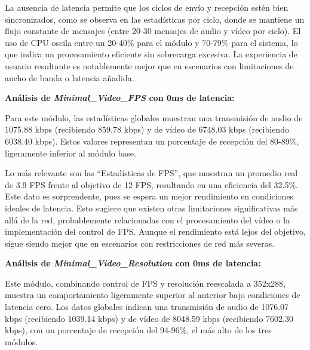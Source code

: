 La ausencia de latencia permite que los ciclos de envío y recepción estén bien sincronizados, como se observa en las estadísticas por ciclo, donde se mantiene un flujo constante de mensajes (entre 20-30 mensajes de audio y vídeo por ciclo). El uso de CPU oscila entre un 20-40\% para el módulo y 70-79\% para el sistema, lo que indica un procesamiento eficiente sin sobrecarga excesiva. La experiencia de usuario resultante es notablemente mejor que en escenarios con limitaciones de ancho de banda o latencia añadida.

\vspace{\baselineskip}

\textbf{Análisis de \textit{Minimal\_Video\_FPS} con 0ms de latencia:}
\vspace{\baselineskip}

Para este módulo, las estadísticas globales muestran una transmisión de audio de 1075.88 kbps (recibiendo 859.78 kbps) y de vídeo de 6748.03 kbps (recibiendo 6038.40 kbps). Estos valores representan un porcentaje de recepción del 80-89\%, ligeramente inferior al módulo base.
\vspace{\baselineskip}

Lo más relevante son las ``Estadísticas de FPS'', que muestran un promedio real de 3.9 FPS frente al objetivo de 12 FPS, resultando en una eficiencia del 32.5\%. Este dato es sorprendente, pues se espera un mejor rendimiento en condiciones ideales de latencia. Esto sugiere que existen otras limitaciones significativas más allá de la red, probablemente relacionadas con el procesamiento del vídeo o la implementación del control de FPS. Aunque el rendimiento está lejos del objetivo, sigue siendo mejor que en escenarios con restricciones de red más severas.

\vspace{\baselineskip}

\textbf{Análisis de \textit{Minimal\_Video\_Resolution} con 0ms de latencia:}
\vspace{\baselineskip}

Este módulo, combinando control de FPS y resolución reescalada a 352x288, muestra un comportamiento ligeramente superior al anterior bajo condiciones de latencia cero. Los datos globales indican una transmisión de audio de 1076.07 kbps (recibiendo 1039.14 kbps) y de vídeo de 8048.59 kbps (recibiendo 7602.30 kbps), con un porcentaje de recepción del 94-96\%, el más alto de los tres módulos.
\vspace{\baselineskip}

